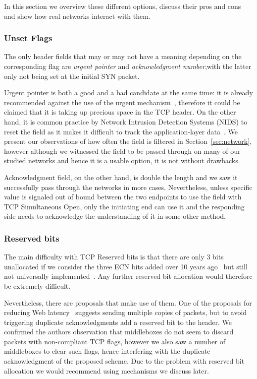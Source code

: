 \documentclass{sig-alternate-10pt}
\begin{document}
In this section we overview these different options, discuss their pros and cons and show how real networks interact with them.

\subsubsection*{Unset Flags}

The only header fields that may or may not have a meaning depending on the corresponding flag are \emph{urgent pointer} and \emph{acknowledgment number},with the latter only not being set at the initial SYN packet.

Urgent pointer is both a good and a bad candidate at the same time: it is already recommended against the use of the urgent mechanism~\cite{Gont:2011vi}, therefore it could be claimed that it is taking up precious space in the TCP header. On the other hand, it is common practice by Network Intrusion Detection Systems (NIDS) to reset the field as it makes it difficult to track the application-layer data~\cite{seolma}. We present our observations of how often the field is filtered in Section~\ref{sec:network}, however although we witnessed the field to be passed through on many of our studied networks and hence it is a usable option, it is not without drawbacks.

Acknowledgment field, on the other hand, is double the length and we saw it successfully pass through the networks in more cases. Nevertheless, unless specific value is signaled out of bound between the two endpoints to use the field with TCP Simultaneous Open, only the initiating end can use it and the responding side needs to acknowledge the understanding of it in some other method. 

\subsubsection*{Reserved bits}

The main difficulty with TCP Reserved bits is that there are only 3 bits unallocated if we consider the three ECN bits added over 10 years ago~\cite{Floyd:up,Ely:uc} but still not universally implemented~\cite{}. Any further reserved bit allocation would therefore be extremely difficult.

Nevertheless, there are proposals that make use of them. One of the proposals for reducing Web latency~\cite{Flach:2013uy} suggests sending multiple copies of packets, but to avoid triggering duplicate acknowledgments add a reserved bit to the header. We confirmed the authors observation that middleboxes do not seem to discard packets with non-compliant TCP flags, however we also saw a number of middleboxes to clear such flags, hence interfering with the duplicate acknowledgment of the proposed scheme. Due to the problem with reserved bit allocation we would recommend using mechanisms we discuss later.
\end{document}

